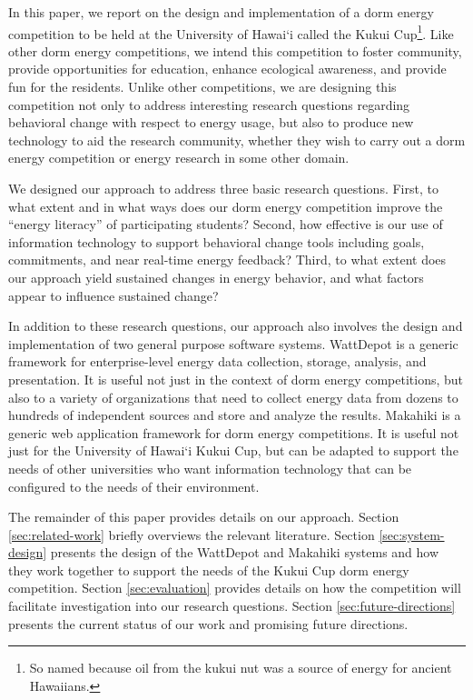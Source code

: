In this paper, we report on the design and implementation of a dorm energy
competition to be held at the University of Hawai`i called the Kukui
Cup\footnote{So named because oil from the kukui nut was a source of energy for
ancient Hawaiians.}. Like other dorm energy competitions, we intend this
competition to foster community, provide opportunities for education, enhance
ecological awareness, and provide fun for the residents.  Unlike other
competitions, we are designing this competition not only to address interesting
research questions regarding behavioral change with respect to energy usage,
but also to produce new technology to aid the research community, whether they
wish to carry out a dorm energy competition or energy research in some
other domain. 

We designed our approach to address three basic research questions.  First,
to what extent and in what ways does our dorm energy competition improve
the ``energy literacy'' of participating students?  Second, how effective
is our use of information technology to support behavioral change tools
including goals, commitments, and near real-time energy feedback? Third, to
what extent does our approach yield sustained changes in energy behavior,
and what factors appear to influence sustained change?

In addition to these research questions, our approach also involves the
design and implementation of two general purpose software systems.
WattDepot is a generic framework for enterprise-level energy data
collection, storage, analysis, and presentation.  It is useful not just in
the context of dorm energy competitions, but also to a variety of organizations
that need to collect energy data from dozens to hundreds of independent sources
and store and analyze the results.  Makahiki is a generic web application
framework for dorm energy competitions.  It is useful not just for the
University of Hawai`i Kukui Cup, but can be adapted to support the needs of
other universities who want information technology that can be configured to
the needs of their environment.

The remainder of this paper provides details on our approach.  Section
\ref{sec:related-work} briefly overviews the relevant literature.  Section
\ref{sec:system-design} presents the design of the WattDepot and Makahiki
systems and how they work together to support the needs of the Kukui Cup
dorm energy competition.  Section \ref{sec:evaluation} provides details
on how the competition will facilitate investigation into our research questions. 
Section \ref{sec:future-directions} presents the current status of our work and promising future
directions. 

